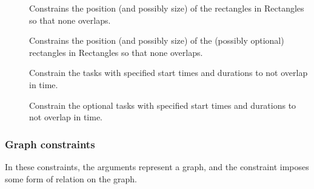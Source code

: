 \begin{description}
\item[]
Constrains the position (and possibly size) of the rectangles in
Rectangles so that none overlaps.

\item[]
Constrains the position (and possibly size) of the (possibly optional)
rectangles in Rectangles so that none overlaps.

\item[]
Constrain the tasks with specified start times and durations to not overlap in time.

\item[]
Constrain the optional tasks with specified start times and durations to
not overlap in time.

\end{description}

\subsubsection{Graph constraints}

In these constraints, the arguments represent a graph, and the
 constraint imposes some form of relation on the graph.

